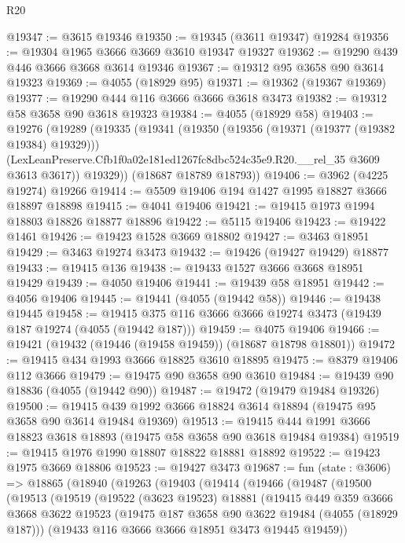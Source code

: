\begin{lexlean}{R20}
\begin{coremodule}
@19347 := @3615 @19346
@19350 := @19345 (@3611 @19347) @19284
@19356 := @19304 @1965 @3666 @3669 @3610 @19347 @19327
@19362 := @19290 @439 @446 @3666 @3668 @3614 @19346
@19367 := @19312 @95 @3658 @90 @3614 @19323
@19369 := @4055 (@18929 @95)
@19371 := @19362 (@19367 @19369)
@19377 := @19290 @444 @116 @3666 @3666 @3618 @3473
@19382 := @19312 @58 @3658 @90 @3618 @19323
@19384 := @4055 (@18929 @58)
@19403 := @19276
    (@19289
      (@19335
        (@19341
          (@19350
            (@19356 (@19371 (@19377 (@19382 @19384) @19329)))
            (LexLeanPreserve.Cfb1f0a02e181ed1267fc8dbc524c35e9.R20.__rel_35 @3609 @3613 @3617))
          @19329))
      (@18687 @18789 @18793))
@19406 := @3962 (@4225 @19274) @19266
@19414 := @5509 @19406 @194 @1427 @1995 @18827 @3666 @18897 @18898
@19415 := @4041 @19406
@19421 := @19415 @1973 @1994 @18803 @18826 @18877 @18896
@19422 := @5115 @19406
@19423 := @19422 @1461
@19426 := @19423 @1528 @3669 @18802
@19427 := @3463 @18951
@19429 := @3463 @19274 @3473
@19432 := @19426 (@19427 @19429) @18877
@19433 := @19415 @136
@19438 := @19433 @1527 @3666 @3668 @18951 @19429
@19439 := @4050 @19406
@19441 := @19439 @58 @18951
@19442 := @4056 @19406
@19445 := @19441 (@4055 (@19442 @58))
@19446 := @19438 @19445
@19458 := @19415 @375 @116 @3666 @3666 @19274 @3473 (@19439 @187 @19274 (@4055 (@19442 @187)))
@19459 := @4075 @19406
@19466 := @19421 (@19432 (@19446 (@19458 @19459)) (@18687 @18798 @18801))
@19472 := @19415 @434 @1993 @3666 @18825 @3610 @18895
@19475 := @8379 @19406 @112 @3666
@19479 := @19475 @90 @3658 @90 @3610
@19484 := @19439 @90 @18836 (@4055 (@19442 @90))
@19487 := @19472 (@19479 @19484 @19326)
@19500 := @19415 @439 @1992 @3666 @18824 @3614 @18894 (@19475 @95 @3658 @90 @3614 @19484 @19369)
@19513 := @19415 @444 @1991 @3666 @18823 @3618 @18893 (@19475 @58 @3658 @90 @3618 @19484 @19384)
@19519 := @19415 @1976 @1990 @18807 @18822 @18881 @18892
@19522 := @19423 @1975 @3669 @18806
@19523 := @19427 @3473
@19687 := fun (state : @3606) =>
  @18865
    (@18940
      (@19263
        (@19403
          (@19414
            (@19466
              (@19487
                (@19500
                  (@19513
                    (@19519
                      (@19522
                        (@3623 @19523)
                        @18881
                        (@19415
                          @449
                          @359
                          @3666
                          @3668
                          @3622
                          @19523
                          (@19475 @187 @3658 @90 @3622 @19484 (@4055 (@18929 @187)))
                          (@19433 @116 @3666 @3666 @18951 @3473 @19445 @19459))

\end{coremodule}
\end{lexlean}
